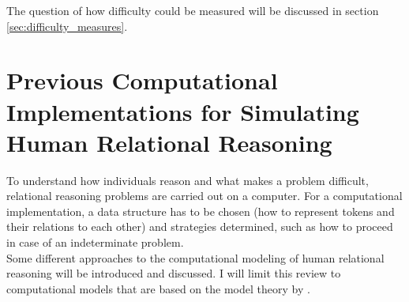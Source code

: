 \documentclass[hidelinks]{scrartcl}
\begin{document}
The question of how difficulty could be measured will be discussed in section \ref{sec:difficulty_measures}.

\section{Previous Computational Implementations for Simulating Human Relational Reasoning}
To understand how individuals reason and what makes a problem difficult, relational reasoning problems are carried out on a computer. For a computational implementation, a data structure has to be chosen (how to represent tokens and their relations to each other) and strategies determined, such as how to proceed in case of an indeterminate problem. \\

Some different approaches to the computational modeling of human relational reasoning will be introduced and discussed. I will limit this review to computational models that are based on the model theory by \cite{Goodwin.2005}.
\end{document}
